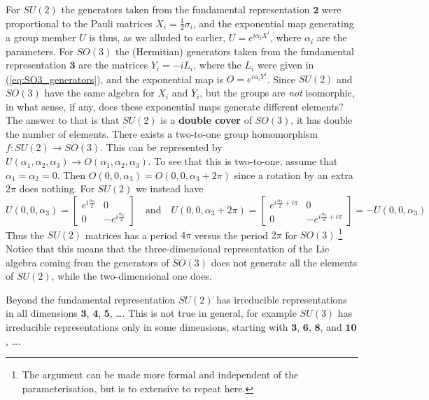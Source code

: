 \documentclass[notes.tex]{subfiles}
\begin{document}
For $SU(2)$ the generators taken from the fundamental representation $\mathbf 2$ were proportional to the Pauli matrices $X_i= \frac{1}{2}\sigma_i$, and the exponential map generating a group member $U$ is thus, as we alluded to earlier, $U=e^{i\alpha_iX^i}$, where $\alpha_i$ are the parameters. For $SO(3)$ the (Hermitian) generators taken from the fundamental representation $\mathbf 3$ are the matrices $Y_i=-iL_i$, where the $L_i$ were given in (\ref{eq:SO3_generators}), and the exponential map is $O=e^{i\alpha_iY^i}$.
Since $SU(2)$ and  $SO(3)$ have the same algebra for $X_i$ and $Y_i$, but the groups are {\it not} isomorphic,  in what sense, if any, does these exponential maps generate different elements? The answer to that is that $SU(2)$ is a {\bf double cover} of $SO(3)$, it has double the number of elements. There exists a two-to-one group homomorphism $f:SU(2)\to SO(3)$. This can be represented by $U(\alpha_1,\alpha_2,\alpha_3)\to O(\alpha_1,\alpha_2,\alpha_3)$. To see that this is two-to-one, assume that $\alpha_1=\alpha_2=0$. Then $O(0,0,\alpha_3)=O(0,0,\alpha_3+2\pi)$ since a rotation by an extra $2\pi$ does nothing. For $SU(2)$ we instead have
\[
U(0,0,\alpha_3)=\left[\begin{matrix} e^{i\frac{\alpha_3}{2}} & 0 \\ 0 & -e^{i\frac{\alpha_3}{2}} \end{matrix}\right] \quad \text{and}\quad U(0,0,\alpha_3+2\pi)=\left[\begin{matrix} e^{i\frac{\alpha_3}{2}+i\pi} & 0 \\ 0 & -e^{i\frac{\alpha_3}{2}+i\pi} \end{matrix}\right]=-U(0,0,\alpha_3)
\]
Thus the $SU(2)$ matrices has a period $4\pi$ versus the period $2\pi$ for $SO(3)$.\footnote{The argument can be made more formal and independent of the parameterisation, but is to extensive to repeat here.} Notice that this means that the three-dimensional representation of the Lie algebra coming from the generators of $SO(3)$ does not generate all the elements of $SU(2)$, while the two-dimensional one does.

Beyond the fundamental representation $SU(2)$ has irreducible representations in all dimensions $\mathbf 3$, $\mathbf 4$, $\mathbf 5$, \ldots. This is not true in general, for example $SU(3)$ has irreducible representations only in some dimensions, starting with $\mathbf 3$, $\mathbf 6$, $\mathbf 8$, and $\mathbf{10}$, \ldots.
\end{document}
